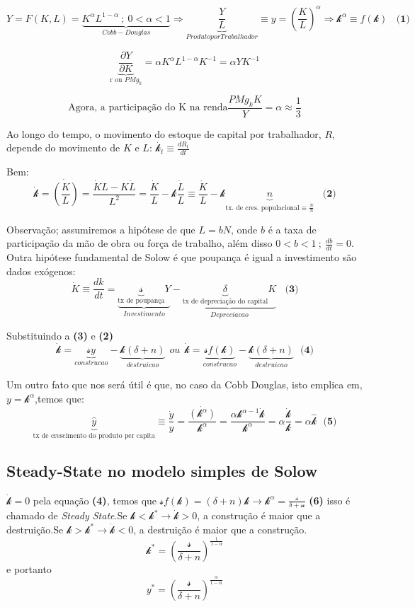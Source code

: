 \documentclass[a4paper,12pt]{article}[abntex2]
\begin{document}
\[
Y=F(K,L)= \underbrace{K^{\alpha}L^{1-\alpha}\ ; \ 0<\alpha<1}_{Cobb-Douglas} \Rightarrow \underbrace{\frac{Y}{L}}_{Produto por Trabalhador}\equiv y={(\frac{K}{L})}^{\alpha}\Rightarrow \mathcal{k}^\alpha \equiv f(\mathcal{k}) \ \ \ \ \textbf{(1)}
\]

\[
\underbrace{\frac{\partial Y}{\partial K}}_\text{r ou \(PMg_k\)}=\alpha K^\alpha L^{1-\alpha}K^{-1}=\alpha YK^{-1}
\]

\[
\text{Agora, a participação do K na renda}\frac{PMg_kK}{Y}=\alpha \approx\frac{1}{3} 
\]

Ao longo do tempo, o movimento do estoque de capital por trabalhador, \(R\), depende do movimento de \(K\) e \(L\): \(\dot{\mathcal{k}_t}\equiv\frac{dR_t}{dt}\)

Bem:
\[
\dot{\mathcal{k}} = \dot{\left(\frac{K}{L}\right)} = \frac{\dot{K}L - K\dot{L}}{L^2} = \frac{\dot{K}}{L} - \mathcal{k}\frac{\dot{L}}{L} \equiv \frac{\dot{K}}{L} - \mathcal{k} \underbrace{n}_{\text{tx. de cres. populacional} \equiv \frac{\dot{N}}{N}}\ \ \ \ \textbf{(2)}
\]

Observação; assumiremos a hipótese de que \(L=bN\), onde \(b\) é a taxa de participação da mão de obra ou força de trabalho, além disso \(0<b<1 \ ; \ \frac{db}{dt}=0 \). Outra hipótese fundamental de Solow é que poupança é igual a investimento são dados exógenos:
\[
\dot{K}\equiv\frac{dk}{dt}=\underbrace{\underbrace{\mathcal{s}}_{\text{tx de poupança}}Y}_{Investimento}-\underbrace{{\underbrace{\delta}_{\text{tx de depreciação do capital}}K}}_{Depreciacao} \ \ \ \ \textbf{(3)}
\]

Substituindo a \textbf{(3)} e \textbf{(2)}
\[
\dot{\mathcal{k}}=\underbrace{\mathcal{s}y}_{construcao}-\underbrace{\mathcal{k}(\delta+n)}_{destruicao} \ \ ou \ \ \dot{\mathcal{k}}=\underbrace{\mathcal{s}f(\mathcal{k})}_{construcao}-\underbrace{\mathcal{k}(\delta+n)}_{destruicao} \ \ \ \textbf{(4)}
\]

Um outro fato que nos será útil é que, no caso da Cobb Douglas, isto emplica em, \(y=\mathcal{k}^\alpha\),temos que:
\[
\underbrace{\hat{y}}_\text{tx de crescimento do produto per capita} \equiv  \frac{\dot{y}}{y}=\frac{\dot{(\mathcal{k}^\alpha)}}{\mathcal{k}^\alpha}=\frac{\alpha \mathcal{k}^{\alpha-1}\dot{\mathcal{k}}}{\mathcal{k}^\alpha}=\alpha\frac{\dot{\mathcal{k}}}{\mathcal{k}}=\alpha \hat{\mathcal{k}} \ \ \ \textbf{(5)}
\]

\subsection{\textbf{Steady-State no modelo simples de Solow}}
\(\dot{\mathcal{k}}=0\) pela equação \textbf{(4)}, temos que \(\mathcal{s}f(\mathcal{k})=(\delta+n)\mathcal{k}\rightarrow \mathcal{k^\alpha=\frac{\mathcal{s}}{\delta +n}}\) \textbf{(6)} isso é chamado de \textit{Steady State}.Se \(\mathcal{k} < \mathcal{k^*}\rightarrow \dot{\mathcal{k}}>0\), a construção é maior que a destruição.Se \(\mathcal{k} >\mathcal{k^*}\rightarrow \dot{\mathcal{k}}<0\), a destruição é maior que a construção.
\[
\mathcal{k^*}=(\frac{\mathcal{s}}{\delta +n})^{\frac{1}{1-\alpha}} 
\]
e portanto
\[
y^*=(\frac{\mathcal{s}}{\delta +n})^{\frac{\alpha}{1-\alpha}} 
\]
\end{document}
